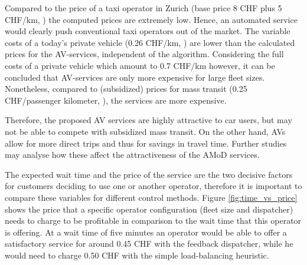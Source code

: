 Compared to the price of a taxi operator in Zurich (base price 8 CHF plus 5 CHF/km, \cite{StadtZurich2014})
the computed prices are extremely low. Hence, an automated service would clearly
push conventional taxi operators out of the market. The variable costs of a today's private vehicle (0.26 CHF/km, \cite{TCS2016}) are lower than the calculated prices for the AV-services, independent of the algorithm. Considering the full costs of a private vehicle which amount to 0.7 CHF/km \cite{TCS2016} however, it can be concluded that AV-services are only more expensive for large fleet sizes. Nonetheless, compared to
(subsidized) prices for mass transit (0.25 CHF/passenger kilometer, \cite{Bosch2016a}), the services are more
expensive.

Therefore, the proposed AV services are highly attractive to car users, but may
not be able to compete with subsidized mass transit. On the other hand, AVs
allow for more direct trips and thus for savings in travel time. Further studies
may analyse how these affect the attractiveness of the AMoD services.

The expected wait time and the price of the service are the two decisive factors
for customers deciding to use one or another operator, therefore it is important
to compare these variables for different control methods. Figure \ref{fig:time_vs_price}
shows the price that a specific operator configuration (fleet size and dispatcher)
needs to charge to be profitable in comparison to the wait time that this operator is offering.
At a wait time of five minutes an operator would be able to offer a satisfactory service for
around 0.45 CHF with the feedback dispatcher, while he would need to charge 0.50 CHF
with the simple load-balancing heuristic.

